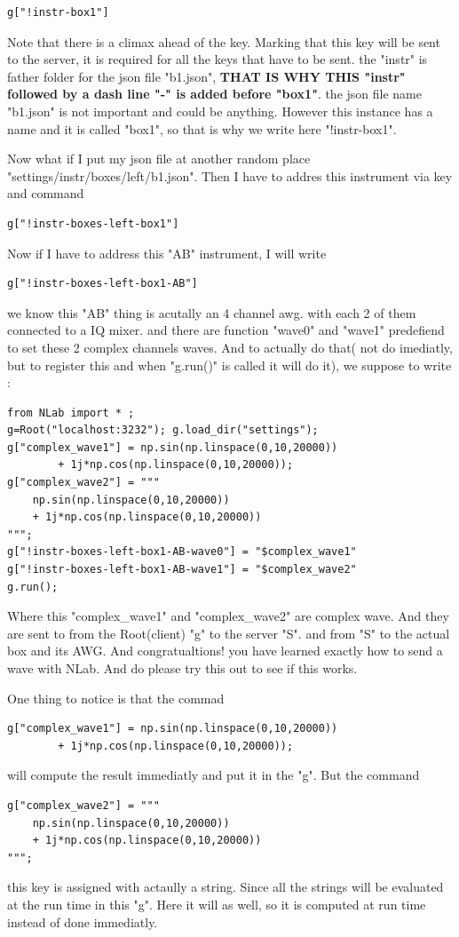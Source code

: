 \documentclass{article}
\begin{document}
\begin{lstlisting}
g["!instr-box1"]
\end{lstlisting}
Note that there is a climax ahead of the key. Marking that this key will be sent
to the server, it is required for all the keys that have to be sent.
the "instr" is father folder for the json file "b1.json", {\bf THAT IS WHY
THIS "instr" followed by a dash line "-" is added before "box1"}.
the json file name "b1.json" is not important and could be anything.
However this instance has a name and it is called "box1", so that is why
we write here "!instr-box1".


Now what if I put my json file at another random place "settings/instr/boxes/left/b1.json".
Then I have to addres this instrument via key and command
\begin{lstlisting}
g["!instr-boxes-left-box1"]
\end{lstlisting}

Now if I have to address this "AB" instrument, 
I will write 
\begin{lstlisting}
g["!instr-boxes-left-box1-AB"]
\end{lstlisting}
we know this "AB" thing is acutally an 4 channel awg. with each 2 of them
connected to a IQ mixer.
and there are function "wave0" and "wave1" predefiend to set these 2 complex channels waves. And to actually do that( not do imediatly, but to register this and when "g.run()" is called it will do it), we suppose to write :

\begin{lstlisting}
from NLab import * ;
g=Root("localhost:3232"); g.load_dir("settings");
g["complex_wave1"] = np.sin(np.linspace(0,10,20000))
		+ 1j*np.cos(np.linspace(0,10,20000));
g["complex_wave2"] = """
	np.sin(np.linspace(0,10,20000))
	+ 1j*np.cos(np.linspace(0,10,20000))
""";
g["!instr-boxes-left-box1-AB-wave0"] = "$complex_wave1"
g["!instr-boxes-left-box1-AB-wave1"] = "$complex_wave2"
g.run();
\end{lstlisting}
Where this "complex\_wave1" and "complex\_wave2" are complex wave.
And they are sent to from the Root(client) "g" to the server "S".
and from "S" to the actual box and its AWG. And congratualtions!
you have learned exactly how to send a wave with NLab. And
do please try this out to see if this works.

One thing to notice is that the commad 

\begin{lstlisting}
g["complex_wave1"] = np.sin(np.linspace(0,10,20000))
		+ 1j*np.cos(np.linspace(0,10,20000));
\end{lstlisting}
	will compute the result immediatly and put it in the "g".
But the command
\begin{lstlisting}
g["complex_wave2"] = """
	np.sin(np.linspace(0,10,20000))
	+ 1j*np.cos(np.linspace(0,10,20000))
""";
\end{lstlisting}
	this key is assigned with actaully a string.
Since all the strings will be evaluated at the run time in this "g".
Here it will as well, so it is computed at run time instead of done
	immediatly.
\end{document}
